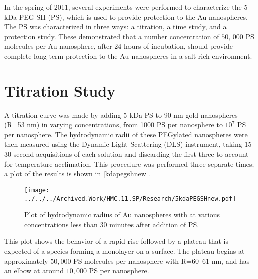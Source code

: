 
\def\mytitle{Chapter 3 -- Characterization of 5 kDa PEG-SH}

\def\bibliocommand{}
In the spring of 2011, several experiments were performed to characterize the 5 kDa PEG-SH (PS), which is used to provide protection to the Au nanospheres. The PS was characterized in three ways: a titration, a time study, and a protection study. These demonstrated that a number concentration of $50,\,000$ PS molecules per Au nanosphere, after 24 hours of incubation, should provide complete long-term protection to the Au nanospheres in a salt-rich environment.

\section{Titration Study}
\label{titrationstudy}

A titration curve was made by adding 5 kDa PS to 90 nm gold nanospheres (R=53 nm) in varying concentrations, from 1000 PS per nanosphere to $10^7$ PS per nanosphere. The hydrodynamic radii of these PEGylated nanospheres were then measured using the Dynamic Light Scattering (DLS) instrument, taking 15 30-second acquisitions of each solution and discarding the first three to account for temperature acclimation. This procedure was performed three separate times; a plot of the results is shown in \autoref{kdapegshnew}.

\begin{figure}[htbp]
\centering
\texttt{[image: ../../../Archived.Work/HMC.11.SP/Research/5kdaPEGSHnew.pdf]}
\caption{Plot of hydrodynamic radius of Au nanospheres with at various concentrations less than 30 minutes after addition of PS.}
\label{kdapegshnew}
\end{figure}



This plot shows the behavior of a rapid rise followed by a plateau that is expected of a species forming a monolayer on a surface. The plateau begins at approximately $50,000$ PS molecules per nanosphere with R=60--61 nm, and has an elbow at around $10,000$ PS per nanosphere.

